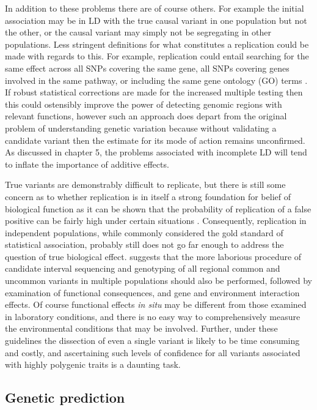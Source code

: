 In addition to these problems there are of course others. For example the initial association may be in LD with the true causal variant in one population but not the other, or the causal variant may simply not be segregating in other populations. Less stringent definitions for what constitutes a replication could be made with regards to this. For example, replication could entail searching for the same effect across all SNPs covering the same gene, all SNPs covering genes involved in the same pathway, or including the same gene ontology (GO) terms \citep{Cantor2010}. If robust statistical corrections are made for the increased multiple testing then this could ostensibly improve the power of detecting genomic regions with relevant functions, however such an approach does depart from the original problem of understanding genetic variation because without validating a candidate variant then the estimate for its mode of action remains unconfirmed. As discussed in chapter 5, the problems associated with incomplete LD will tend to inflate the importance of additive effects.

True variants are demonstrably difficult to replicate, but there is still some concern as to whether replication is in itself a strong foundation for belief of biological function as it can be shown that the probability of replication of a false positive can be fairly high under certain situations \citep{Liu2008}. Consequently, replication in independent populations, while commonly considered the gold standard of statistical association, probably still does not go far enough to address the question of true biological effect. \citet{Chanock2007} suggests that the more laborious procedure of candidate interval sequencing and genotyping of all regional common and uncommon variants in multiple populations should also be performed, followed by examination of functional consequences, and gene and environment interaction effects. Of course functional effects \emph{in situ} may be different from those examined in laboratory conditions, and there is no easy way to comprehensively measure the environmental conditions that may be involved. Further, under these guidelines the dissection of even a single variant is likely to be time consuming and costly, and ascertaining such levels of confidence for all variants associated with highly polygenic traits is a daunting task.


\subsection{Genetic prediction}

